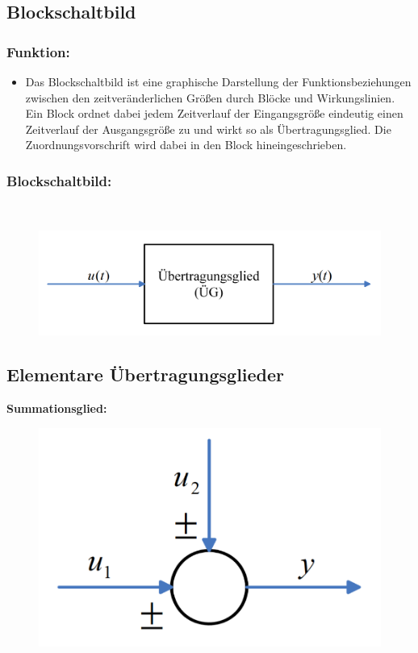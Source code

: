 \documentclass[10pt,a4paper]{article}
\begin{document}
\subsection{Blockschaltbild}
\subsubsection*{Funktion:}
\begin{itemize}
	\item Das Blockschaltbild ist eine graphische Darstellung der Funktionsbeziehungen zwischen den zeitveränderlichen Größen durch Blöcke und Wirkungslinien. Ein Block ordnet dabei jedem Zeitverlauf der Eingangsgröße eindeutig einen Zeitverlauf der Ausgangsgröße zu und wirkt so als Übertragungsglied.
	Die Zuordnungsvorschrift wird dabei in den Block hineingeschrieben.
\end{itemize}

\subsubsection*{Blockschaltbild:} ~\\
\begin{figure}[H]
	\includegraphics[width=0.8\columnwidth]{imgs/abb2_4.png}
\end{figure}

\subsection{Elementare Übertragungsglieder}
\textbf{Summationsglied:}
\begin{figure}[H]
	\includegraphics[width=0.2\columnwidth]{imgs/sumglied.png}
\end{figure}
\end{document}
